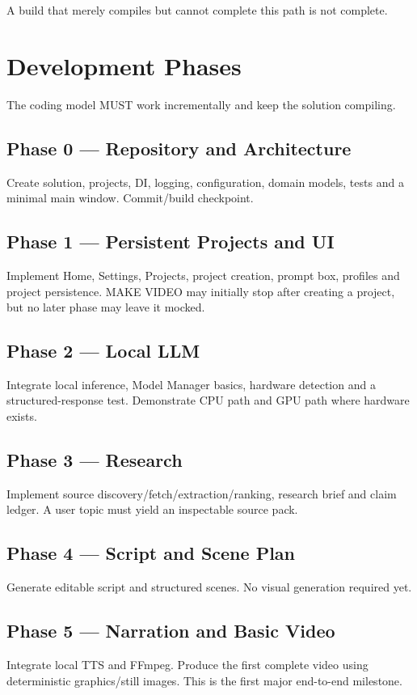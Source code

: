 \documentclass[10pt,journal,compsoc]{IEEEtran}
\begin{document}
A build that merely compiles but cannot complete this path is not complete.

\section{Development Phases}

The coding model MUST work incrementally and keep the solution compiling.

\subsection{Phase 0 --- Repository and Architecture}
Create solution, projects, DI, logging, configuration, domain models, tests and a minimal main window. Commit/build checkpoint.

\subsection{Phase 1 --- Persistent Projects and UI}
Implement Home, Settings, Projects, project creation, prompt box, profiles and project persistence. MAKE VIDEO may initially stop after creating a project, but no later phase may leave it mocked.

\subsection{Phase 2 --- Local LLM}
Integrate local inference, Model Manager basics, hardware detection and a structured-response test. Demonstrate CPU path and GPU path where hardware exists.

\subsection{Phase 3 --- Research}
Implement source discovery/fetch/extraction/ranking, research brief and claim ledger. A user topic must yield an inspectable source pack.

\subsection{Phase 4 --- Script and Scene Plan}
Generate editable script and structured scenes. No visual generation required yet.

\subsection{Phase 5 --- Narration and Basic Video}
Integrate local TTS and FFmpeg. Produce the first complete video using deterministic graphics/still images. This is the first major end-to-end milestone.
\end{document}
